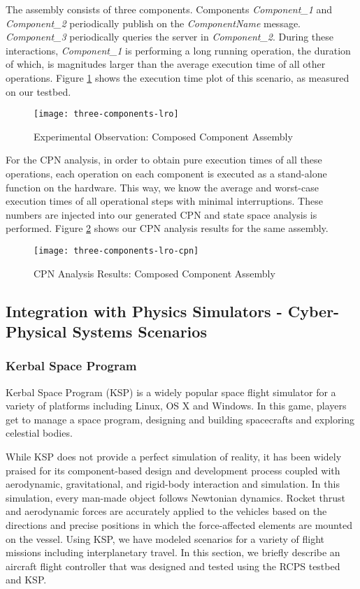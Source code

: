 The assembly consists of three components. Components \emph{Component\_1} and \emph{Component\_2} periodically publish on the \emph{ComponentName} message. \emph{Component\_3} periodically queries the server in \emph{Component\_2}. During these interactions, \emph{Component\_1} is performing a long running operation, the duration of which, is magnitudes larger than the average execution time of all other operations. Figure \ref{fig:three-components-lro} shows the execution time plot of this scenario, as measured on our testbed. 

\begin{figure}[h]
	\centering
	\texttt{[image: three-components-lro]}
	\caption{Experimental Observation: Composed Component Assembly}
	\label{fig:three-components-lro}
\end{figure}
\FloatBarrier

For the CPN analysis, in order to obtain pure execution times of all these operations, each operation on each component is executed as a stand-alone function on the hardware. This way, we know the average and worst-case execution times of all operational steps with minimal interruptions. These numbers are injected into our generated CPN and state space analysis is performed. Figure \ref{fig:three-components-lro-cpn} shows our CPN analysis results for the same assembly.


\begin{figure}[h]
	\centering
	\texttt{[image: three-components-lro-cpn]}
	\caption{CPN Analysis Results: Composed Component Assembly}
	\label{fig:three-components-lro-cpn}
\end{figure}
\FloatBarrier

\subsection{Integration with Physics Simulators - Cyber-Physical Systems Scenarios}

\subsubsection{Kerbal Space Program}

Kerbal Space Program \cite{KSP} (KSP) is a widely popular space flight simulator for a variety of platforms including Linux, OS X and Windows. In this game, players get to manage a space program, designing and building spacecrafts and exploring celestial bodies. 

While KSP does not provide a perfect simulation of reality, it has been widely praised for its component-based design and development process coupled with aerodynamic, gravitational, and rigid-body interaction and simulation. In this simulation, every man-made object follows Newtonian dynamics. Rocket thrust and aerodynamic forces are accurately applied to the vehicles based on the directions and precise positions in which the force-affected elements are mounted on the vessel. Using KSP, we have modeled scenarios for a variety of flight missions including interplanetary travel. In this section, we briefly describe an aircraft flight controller that was designed and tested using the RCPS testbed and KSP.


